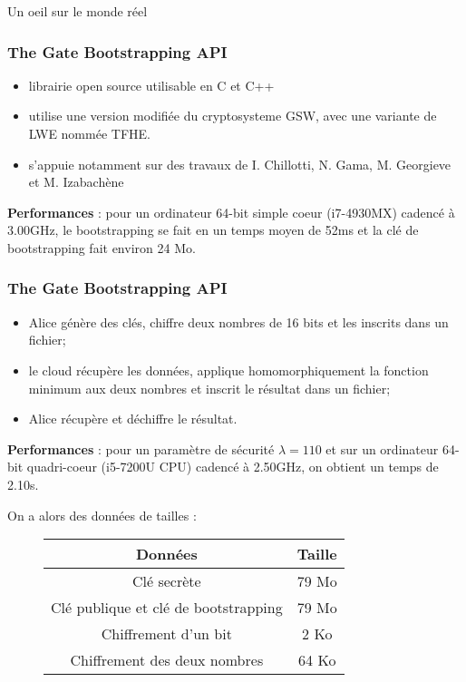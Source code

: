 \documentclass[10pt,xcolor={usenames,dvipsnames}]{beamer}
\begin{document}
\begin{section}{Un oeil sur le monde réel}


\begin{frame} 
\frametitle{The Gate Bootstrapping API}
\begin{itemize}
\item librairie open source utilisable en C et C++ 
\item utilise une version modifiée du cryptosysteme GSW, avec une variante de LWE nommée TFHE.
\item s'appuie notamment sur des travaux de I. Chillotti, N. Gama, M. Georgieve et M. Izabachène 
\end{itemize}
\textbf{Performances} : pour un ordinateur 64-bit simple coeur (i7-4930MX) cadencé à 3.00GHz, le bootstrapping se fait en un temps moyen de 52ms
et la clé de bootstrapping fait environ 24 Mo.
 

\end{frame} 

\begin{frame} 
\frametitle{The Gate Bootstrapping API}
\begin{itemize}
\item Alice génère des clés, chiffre deux nombres de 16 bits et les inscrits dans un fichier;
\item le cloud récupère les données, applique homomorphiquement la fonction minimum aux deux nombres et inscrit le résultat dans un fichier;
\item Alice récupère et déchiffre le résultat.
\end{itemize}
\textbf{Performances} : pour un paramètre de sécurité $\lambda = 110$ et sur un ordinateur 64-bit quadri-coeur (i5-7200U CPU) cadencé à 2.50GHz, on obtient un temps de 2.10s.

On a alors des données de tailles :

\begin{figure}
\begin{tabular}{|c|c|}
\hline
Données & Taille \\
\hline
Clé secrète & 79 Mo \\
\hline
Clé publique et clé de bootstrapping  & 79 Mo \\
\hline
Chiffrement d'un bit & 2 Ko \\
\hline
Chiffrement des deux nombres & 64 Ko\\
\hline
\end{tabular}
\end{figure}

\end{frame} 


\end{section}
\end{document}
